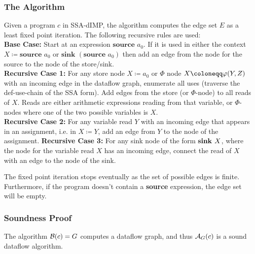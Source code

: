 \subsubsection*{The Algorithm}
Given a program $c$ in SSA-dIMP, the algorithm computes
the edge set $E$ as a least fixed point iteration.
The following recursive rules are used:\\
\textbf{Base Case:} Start at an expression $\textbf{source }a_0$.
If it is used in either the context $X \coloneqq \textbf{source }a_0$
or $\textbf{sink }(\textbf{source }a_0)$ then add an edge from the node for the
source to the node of the store/sink.\\
\textbf{Recursive Case 1:} For any store node $X \coloneqq a_0$ or
$\Phi$ node $\phistore{X}{Y}{Z}$ with an incoming edge
in the dataflow graph, enumerate all uses (traverse
the def-use-chain of the SSA form). Add edges from the store (or $\Phi$-node)
to all reads of $X$.
Reads are either arithmetic expressions reading from that variable,
or $\Phi$-nodes where one of the two possible variables is $X$.\\
\textbf{Recursive Case 2:} For any variable read $Y$ with an incoming edge that appears in an 
assignment, i.e. in $X \coloneqq Y$, add an edge from $Y$ to the node of the assignment.
\textbf{Recursive Case 3:} For any sink node of the form $\textbf{sink }{X}$,
where the node for the variable read $X$ has an incoming edge, connect 
the read of $X$ with an edge to the node of the sink.

The fixed point iteration stops eventually as the set of possible edges is
finite. Furthermore, if the program doesn't contain a \textbf{source} expression,
the edge set will be empty.


\subsubsection*{Soundness Proof}
\begin{theorem}
    \label{thm:df-soundness}
    The algorithm $\operatorname{\mathcal{B}}(c) = G$ computes a dataflow graph, and thus 
    $\operatorname{\mathcal{A}}_G(c)$ is a sound dataflow algorithm.
\end{theorem}

